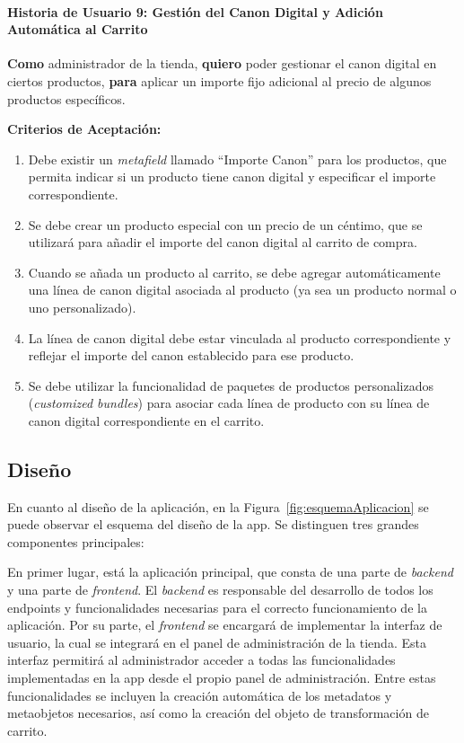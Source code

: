 \documentclass[11pt]{article}
\newcommand{\subsubsubsection}[1]{\paragraph{#1}}
\begin{document}
\subsubsubsection{Historia de Usuario 9: Gestión del Canon Digital y Adición Automática al Carrito}\label{sec:historia9}

\textbf{Como} administrador de la tienda,
\textbf{quiero} poder gestionar el canon digital en ciertos productos,
\textbf{para} aplicar un importe fijo adicional al precio de algunos productos específicos.

\vspace{0.5cm}
\textbf{Criterios de Aceptación:}
\begin{enumerate}[label=\arabic*.]
    \item Debe existir un \textit{metafield} llamado ``Importe Canon'' para los productos, que permita indicar si un producto tiene canon digital y especificar el importe correspondiente.
    \item Se debe crear un producto especial con un precio de un céntimo, que se utilizará para añadir el importe del canon digital al carrito de compra.
    \item Cuando se añada un producto al carrito, se debe agregar automáticamente una línea de canon digital asociada al producto (ya sea un producto normal o uno personalizado).
    \item La línea de canon digital debe estar vinculada al producto correspondiente y reflejar el importe del canon establecido para ese producto.
    \item Se debe utilizar la funcionalidad de paquetes de productos personalizados (\textit{customized bundles}) para asociar cada línea de producto con su línea de canon digital correspondiente en el carrito.
\end{enumerate}

\clearpage
\subsection{Diseño}

En cuanto al diseño de la aplicación, en la Figura~\ref{fig:esquemaAplicacion} se puede observar el esquema del diseño de la app.
Se distinguen tres grandes componentes principales:

En primer lugar, está la aplicación principal, que consta de una parte de \textit{backend} y una parte de \textit{frontend}.
El \textit{backend} es responsable del desarrollo de todos los endpoints y funcionalidades necesarias para el correcto 
funcionamiento de la aplicación. Por su parte, el \textit{frontend} se encargará de implementar la interfaz de usuario, 
la cual se integrará en el panel de administración de la tienda. Esta interfaz permitirá al administrador acceder 
a todas las funcionalidades implementadas en la app desde el propio panel de administración. Entre estas funcionalidades 
se incluyen la creación automática de los metadatos y metaobjetos necesarios, así como la creación del objeto de transformación de carrito.
\end{document}
